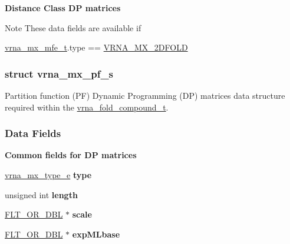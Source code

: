 \begin{Indent}{\bf Distance Class DP matrices}\par
{\em \begin{DoxyNote}{Note}
These data fields are available if 
\begin{DoxyCode}
\hyperlink{group__dp__matrices_structvrna__mx__mfe__s}{vrna\_mx\_mfe\_t}.type == \hyperlink{group__dp__matrices_gga6042ea1d58d01931e959791be6d89343ae656f8391445ff71bed8a597a0a19417}{VRNA\_MX\_2DFOLD} 
\end{DoxyCode}
 
\end{DoxyNote}
}\end{Indent}
\label{structvrna__mx__pf__s}
\hypertarget{group__dp__matrices_structvrna__mx__pf__s}{}
\subsubsection{struct vrna\+\_\+mx\+\_\+pf\+\_\+s}
Partition function (PF) Dynamic Programming (DP) matrices data structure required within the \hyperlink{group__fold__compound_ga1b0cef17fd40466cef5968eaeeff6166}{vrna\+\_\+fold\+\_\+compound\+\_\+t}. \subsubsection*{Data Fields}
\begin{Indent}{\bf Common fields for DP matrices}\par
\begin{DoxyCompactItemize}
\item 
\hyperlink{group__dp__matrices_ga6042ea1d58d01931e959791be6d89343}{vrna\+\_\+mx\+\_\+type\+\_\+e} {\bfseries type}\hypertarget{group__dp__matrices_a74ba745d6fc4ac5d437bc24450ea789c}{}\label{group__dp__matrices_a74ba745d6fc4ac5d437bc24450ea789c}

\item 
unsigned int {\bfseries length}\hypertarget{group__dp__matrices_a798f72ece3f3f970bb0de2120600ad63}{}\label{group__dp__matrices_a798f72ece3f3f970bb0de2120600ad63}

\item 
\hyperlink{group__data__structures_ga31125aeace516926bf7f251f759b6126}{F\+L\+T\+\_\+\+O\+R\+\_\+\+D\+BL} $\ast$ {\bfseries scale}\hypertarget{group__dp__matrices_a133ac57938cb0969da254a594572baf8}{}\label{group__dp__matrices_a133ac57938cb0969da254a594572baf8}

\item 
\hyperlink{group__data__structures_ga31125aeace516926bf7f251f759b6126}{F\+L\+T\+\_\+\+O\+R\+\_\+\+D\+BL} $\ast$ {\bfseries exp\+M\+Lbase}\hypertarget{group__dp__matrices_ae18e83833416f62943d5dd7be1cc038f}{}\label{group__dp__matrices_ae18e83833416f62943d5dd7be1cc038f}

\end{DoxyCompactItemize}
\end{Indent}
